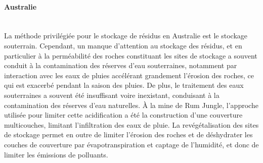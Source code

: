 \documentclass{article}
\begin{document}
\paragraph{Australie \\ \\}
La méthode privilégiée pour le stockage de résidus en Australie est le stockage souterrain. Cependant, un manque d’attention au stockage des résidus, et en particulier à la perméabilité des roches constituant les sites de stockage a souvent conduit à la contamination des réserves d’eau souterraines, notamment par interaction avec les eaux de pluies accélérant grandement l’érosion des roches, ce qui est exacerbé pendant la saison des pluies. De plus, le traitement des eaux souterraines a souvent été insuffisant voire inexistant, conduisant à la contamination des réserves d’eau naturelles. À la mine de Rum Jungle, l’approche utilisée pour limiter cette acidification a été la construction d’une couverture multicouches, limitant l’infiltration des eaux de pluie.%
La revégétalisation des sites de stockage permet en outre de limiter l’érosion des roches et de déshydrater les couches de couverture par évapotranspiration et captage de l’humidité, et donc de limiter les émissions de polluants.
\end{document}
